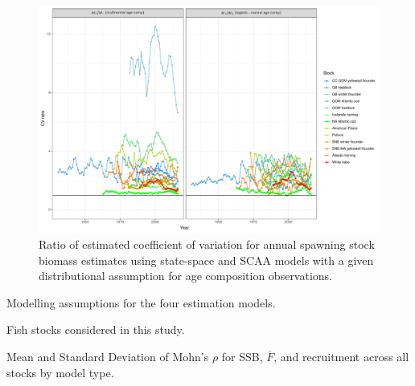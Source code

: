 \documentclass[12pt,letterpaper, leqno]{article}
\begin{document}
\begin{landscape}
\begin{figure}
\caption{Ratio of estimated coefficient of variation for annual spawning stock biomass estimates using state-space and SCAA models with a given distributional assumption for age composition observations.}\label{wham_SSB_CV_ratio}
\begin{center}
\includegraphics[height = 0.9\textheight]{wham_CV_ratio_SSB.pdf}
\end{center}
\end{figure}
\end{landscape}

\clearpage


\begin{landscape}
\begin{table}
\begin{center}
\caption{Modelling assumptions for the four estimation models.}\label{assumption_models}

\end{center}
\end{table}

\begin{table}
\begin{center}
\caption{Fish stocks considered in this study.}\label{fish_stocks}

\end{center}
\end{table}

\end{landscape}

\begin{table}
\begin{center}
\caption{Mean and Standard Deviation of Mohn's $\rho$ for SSB, $\overline{F}$, and recruitment across all stocks by model type.}\label{model_compare}

\end{center}
\end{table}
\end{document}
